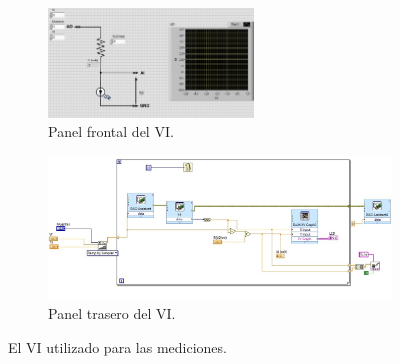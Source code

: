\documentclass[a4paper,12pt]{article}
\begin{document}
\begin{figure}
	\begin{subfigure}{\textwidth}
		\centering
		\includegraphics[width = 0.6\textwidth]{front.jpg}
		\caption{Panel frontal del VI.}
		\centering
	\end{subfigure}


	\begin{subfigure}{\textwidth}
		\centering
		\includegraphics[width = \textwidth]{back.jpg}
		\caption{Panel trasero del VI.}
		\label{fig:right}
	\end{subfigure}

	\caption{El VI utilizado para las mediciones.}
	\label{fig:combined}
\end{figure}
\end{document}
